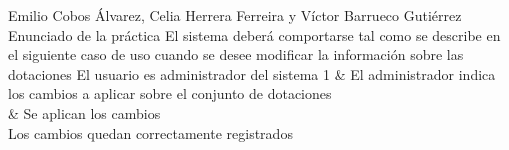 {Emilio Cobos Álvarez, Celia Herrera Ferreira y Víctor Barrueco Gutiérrez}
{Enunciado de la práctica}
{}
{}
{El sistema deberá comportarse tal como se describe en el siguiente caso de uso cuando se desee modificar la información sobre las dotaciones}
{El usuario es administrador del sistema}
{
1 & El administrador indica los cambios a aplicar sobre el conjunto de dotaciones \\  & Se aplican los cambios \\
}
{Los cambios quedan correctamente registrados}
{}

